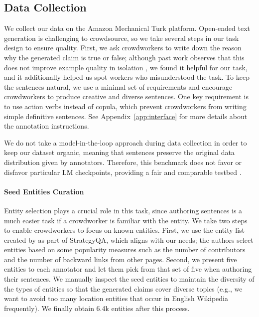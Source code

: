 \subsection{Data Collection}\label{sec:data-collection}
We collect our data on the Amazon Mechanical Turk platform. Open-ended text generation is challenging to crowdsource, so we take several steps in our task design to ensure quality. First, we ask crowdworkers to write down the reason why the generated claim is true or false; although past work observes that this does not improve example quality in isolation \citep{Nikita_Nangia_2021}, we found it helpful for our task, and it additionally helped us spot workers who misunderstood the task. To keep the sentences natural, we use a minimal set of requirements and encourage crowdworkers to produce creative and diverse sentences. One key requirement is to use action verbs instead of copula, which prevent crowdworkers from writing simple definitive sentences. See Appendix~\ref{app:interface} for more details about the annotation instructions. 

We do not take a model-in-the-loop approach \citep{Rowan_Zellers_2018,Rown_Zeller_2019,Yixin_Nie_2020,Ronan_Le_Bras_2020} during data collection in order to keep our dataset organic, meaning that sentences preserve the original data distribution given by annotators. Therefore, this benchmark does not favor or disfavor particular LM checkpoints, providing a fair and comparable testbed \citep{Sam_Bowman_2021}.

\paragraph{Seed Entities Curation} Entity selection plays a crucial role in this task, since authoring sentences is a much easier task if a crowdworker is familiar with the entity. We take two steps to enable crowdworkers to focus on known entities. First, we use the entity list created by \citet{Mor_Geva_2021} as part of StrategyQA, which aligns with our needs; the authors select entities based on some popularity measures such as the number of contributors and the number of backward links from other pages. Second, we present five entities to each annotator and let them pick from that set of five when authoring their sentences. %
We manually inspect the seed entities to maintain the diversity of the types of entities so that the generated claims cover diverse topics (e.g., we want to avoid too many location entities that occur in English Wikipedia frequently). We finally obtain 6.4k entities after this process. 

